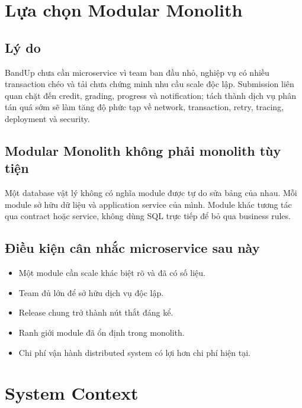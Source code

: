 \documentclass[11pt,a4paper]{article}
\begin{document}
\section{Lựa chọn Modular Monolith}

\subsection{Lý do}
BandUp chưa cần microservice vì team ban đầu nhỏ, nghiệp vụ có nhiều transaction chéo và tải chưa chứng minh nhu cầu scale độc lập. Submission liên quan chặt đến credit, grading, progress và notification; tách thành dịch vụ phân tán quá sớm sẽ làm tăng độ phức tạp về network, transaction, retry, tracing, deployment và security.

\subsection{Modular Monolith không phải monolith tùy tiện}
\begin{importantbox}
Một database vật lý không có nghĩa module được tự do sửa bảng của nhau. Mỗi module sở hữu dữ liệu và application service của mình. Module khác tương tác qua contract hoặc service, không dùng SQL trực tiếp để bỏ qua business rules.
\end{importantbox}

\subsection{Điều kiện cân nhắc microservice sau này}
\begin{itemize}
  \item Một module cần scale khác biệt rõ và đã có số liệu.
  \item Team đủ lớn để sở hữu dịch vụ độc lập.
  \item Release chung trở thành nút thắt đáng kể.
  \item Ranh giới module đã ổn định trong monolith.
  \item Chi phí vận hành distributed system có lợi hơn chi phí hiện tại.
\end{itemize}

\section{System Context}
\end{document}
